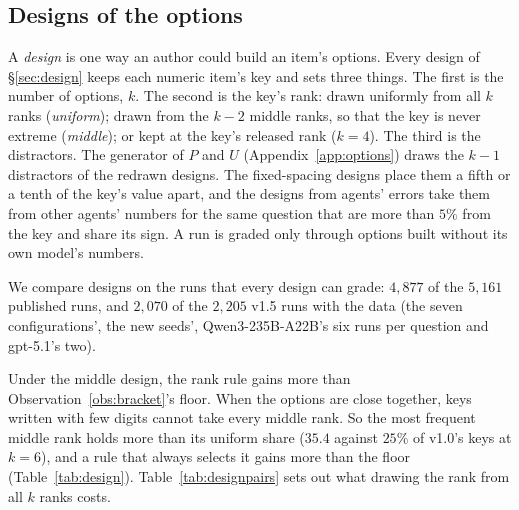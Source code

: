 \documentclass{article}
\begin{document}
\FloatBarrier
\subsection{Designs of the options}
\label{app:design}

A \emph{design} is one way an author could build an item's options. Every design of \S\ref{sec:design} keeps each
numeric item's key and sets three things. The first is the number of options, $k$. The second is the key's rank:
drawn uniformly from all $k$ ranks (\emph{uniform}); drawn from the $k-2$ middle ranks, so that the key is never
extreme (\emph{middle}); or kept at the key's released rank ($k=4$). The third is the distractors. The generator of
$P$ and $U$ (Appendix~\ref{app:options}) draws the $k-1$ distractors of the redrawn designs. The fixed-spacing designs
place them a fifth or a tenth of the key's value apart, and the designs from agents' errors take them from other agents' numbers for the same question that are more than $5\%$ from the
key and share its sign. A run is graded only through options built without its own model's numbers.

We compare designs on the runs that every design can grade: $4{,}877$ of the $5{,}161$ published runs, and $2{,}070$
of the $2{,}205$ v1.5 runs with the data (the seven configurations', the new seeds', Qwen3-235B-A22B's six runs per
question and gpt-5.1's two).

Under the middle design, the rank rule gains more than Observation~\ref{obs:bracket}'s floor. When the options are
close together, keys written with few digits cannot take every middle rank. So the most frequent middle rank holds
more than its uniform share ($35.4$ against $25\%$ of v1.0's keys at $k=6$), and a rule that always selects it gains
more than the floor (Table~\ref{tab:design}).
Table~\ref{tab:designpairs} sets out what drawing the rank from all $k$ ranks costs.
\end{document}
